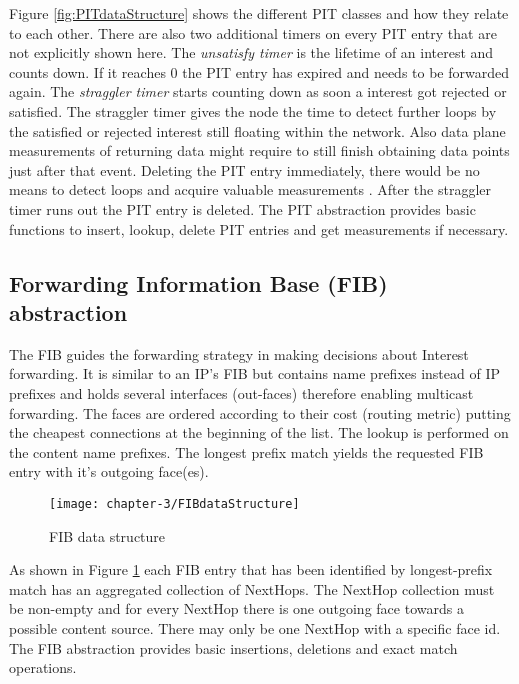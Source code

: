 Figure \ref{fig:PITdataStructure} shows the different PIT classes and how they relate to each other. There are also two additional timers on every PIT entry that are not explicitly shown here. The \emph{unsatisfy timer} is the lifetime of an interest and counts down. If it reaches 0 the PIT entry has expired and needs to be forwarded again. The \emph{straggler timer} starts counting down as soon a interest got rejected or satisfied. The straggler timer gives the node the time to detect further loops by the satisfied or rejected interest still floating within the network. Also data plane measurements of returning data might require to still finish obtaining data points just after that event. Deleting the PIT entry immediately, there would be no means to detect loops and acquire valuable measurements \cite{Afanasyev16}. After the straggler timer runs out the PIT entry is deleted. The PIT abstraction provides basic functions to insert, lookup, delete PIT entries and get measurements if necessary.

\subsection{Forwarding Information Base (FIB) abstraction}

The FIB guides the forwarding strategy in making decisions about Interest forwarding. It is similar to an IP's FIB but contains name prefixes instead of IP prefixes and holds several interfaces (out-faces) therefore enabling multicast forwarding. The faces are ordered according to their cost (routing metric) putting the cheapest connections at the beginning of the list. The lookup is performed on the content name prefixes. The longest prefix match yields the requested FIB entry with it's outgoing face(es).

\begin{figure}[H]
  \centering
  \texttt{[image: chapter-3/FIBdataStructure]}
  \caption{FIB data structure}
  \label{fig:FIBdataStructure}
\end{figure}

As shown in Figure \ref{fig:FIBdataStructure} each FIB entry that has been identified by longest-prefix match has an aggregated collection of NextHops. The NextHop collection must be non-empty and for every NextHop there is one outgoing face towards a possible content source. There may only be one NextHop with a specific face id. The FIB abstraction provides basic insertions, deletions and exact match operations.

